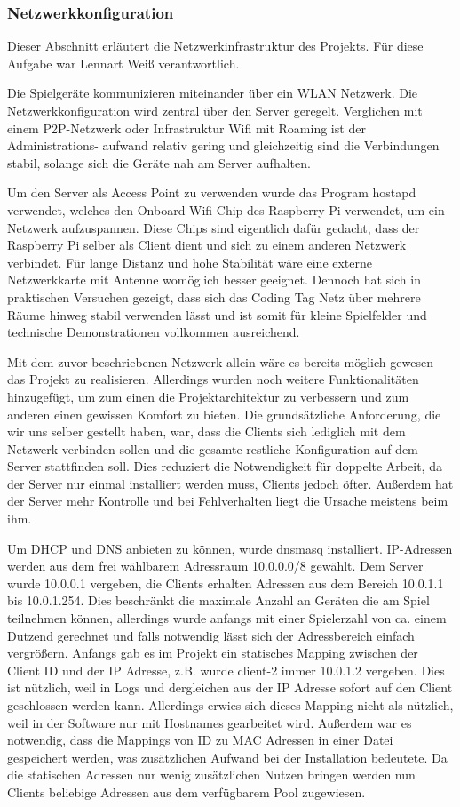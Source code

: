 \subsubsection{Netzwerkkonfiguration}

Dieser Abschnitt erläutert die Netzwerkinfrastruktur des Projekts.
Für diese Aufgabe war Lennart Weiß verantwortlich.

Die Spielgeräte kommunizieren miteinander über ein WLAN Netzwerk. Die
Netzwerkkonfiguration wird zentral über den Server geregelt. Verglichen mit
einem P2P-Netzwerk oder Infrastruktur Wifi mit Roaming ist der Administrations-
aufwand relativ gering und gleichzeitig sind die Verbindungen stabil, solange
sich die Geräte nah am Server aufhalten.

Um den Server als Access Point zu verwenden wurde das Program hostapd verwendet,
welches den Onboard Wifi Chip des Raspberry Pi verwendet, um ein Netzwerk
aufzuspannen. Diese Chips sind eigentlich dafür gedacht, dass der Raspberry Pi
selber als Client dient und sich zu einem anderen Netzwerk verbindet. Für lange
Distanz und hohe Stabilität wäre eine externe Netzwerkkarte mit Antenne
womöglich besser geeignet. Dennoch hat sich in praktischen Versuchen gezeigt,
dass sich das Coding Tag Netz über mehrere Räume hinweg stabil verwenden lässt
und ist somit für kleine Spielfelder und technische Demonstrationen vollkommen
ausreichend.

Mit dem zuvor beschriebenen Netzwerk allein wäre es bereits möglich gewesen
das Projekt zu realisieren. Allerdings wurden noch weitere Funktionalitäten
hinzugefügt, um zum einen die Projektarchitektur zu verbessern und zum anderen
einen gewissen Komfort zu bieten. Die grundsätzliche Anforderung, die wir uns
selber gestellt haben, war, dass die Clients sich lediglich mit dem Netzwerk
verbinden sollen und die gesamte restliche Konfiguration auf dem Server 
stattfinden soll. Dies reduziert die Notwendigkeit für doppelte Arbeit, da der
Server nur einmal installiert werden muss, Clients jedoch öfter. Außerdem hat
der Server mehr Kontrolle und bei Fehlverhalten liegt die Ursache meistens beim
ihm.

Um DHCP und DNS anbieten zu können, wurde dnsmasq installiert. IP-Adressen
werden aus dem frei wählbarem Adressraum 10.0.0.0/8 gewählt. Dem Server wurde
10.0.0.1 vergeben, die Clients erhalten Adressen aus dem Bereich 10.0.1.1 bis
10.0.1.254. Dies beschränkt die maximale Anzahl an Geräten die am Spiel
teilnehmen können, allerdings wurde anfangs mit einer Spielerzahl von ca.
einem Dutzend gerechnet und falls notwendig lässt sich der Adressbereich einfach
vergrößern. Anfangs gab es im Projekt ein statisches Mapping zwischen der
Client ID und der IP Adresse, z.B. wurde client-2 immer 10.0.1.2 vergeben.
Dies ist nützlich, weil in Logs und dergleichen aus der IP Adresse sofort auf
den Client geschlossen werden kann. Allerdings erwies sich dieses Mapping nicht
als nützlich, weil in der Software nur mit Hostnames gearbeitet wird. Außerdem
war es notwendig, dass die Mappings von ID zu MAC Adressen in einer Datei
gespeichert werden, was zusätzlichen Aufwand bei der Installation bedeutete.
Da die statischen Adressen nur wenig zusätzlichen Nutzen bringen werden nun
Clients beliebige Adressen aus dem verfügbarem Pool zugewiesen.

